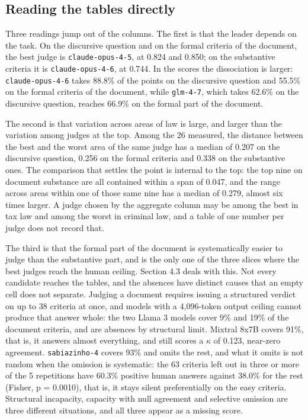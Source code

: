 \documentclass{IOS-Book-Article}
\begin{document}
\subsection{Reading the tables directly}

Three readings jump out of the columns. The first is that the leader depends on the task. On the discursive question and on the formal criteria of the document, the best judge is \texttt{claude-opus-4-5}, at 0.824 and 0.850; on the substantive criteria it is \texttt{claude-opus-4-6}, at 0.744. In the scores the dissociation is larger: \texttt{claude-opus-4-6} takes 88.8\% of the points on the discursive question and 55.5\% on the formal criteria of the document, while \texttt{glm-4-7}, which takes 62.6\% on the discursive question, reaches 66.9\% on the formal part of the document.

The second is that variation across areas of law is large, and larger than the variation among judges at the top. Among the 26 measured, the distance between the best and the worst area of the same judge has a median of 0.207 on the discursive question, 0.256 on the formal criteria and 0.338 on the substantive ones. The comparison that settles the point is internal to the top: the top nine on document substance are all contained within a span of 0.047, and the range across areas within one of those same nine has a median of 0.279, almost six times larger. A judge chosen by the aggregate column may be among the best in tax law and among the worst in criminal law, and a table of one number per judge does not record that.

The third is that the formal part of the document is systematically easier to judge than the substantive part, and is the only one of the three slices where the best judges reach the human ceiling. Section 4.3 deals with this. Not every candidate reaches the tables, and the absences have distinct causes that an empty cell does not separate. Judging a document requires issuing a structured verdict on up to 38 criteria at once, and models with a 4,096-token output ceiling cannot produce that answer whole: the two Llama 3 models cover 9\% and 19\% of the document criteria, and are absences by structural limit. Mixtral 8x7B covers 91\%, that is, it answers almost everything, and still scores a $\kappa$ of 0.123, near-zero agreement. \texttt{sabiazinho-4} covers 93\% and omits the rest, and what it omits is not random when the omission is systematic: the 63 criteria left out in three or more of the 5 repetitions have 60.3\% positive human answers against 38.0\% for the rest (Fisher, p = 0.0010), that is, it stays silent preferentially on the easy criteria. Structural incapacity, capacity with null agreement and selective omission are three different situations, and all three appear as a missing score.
\end{document}
